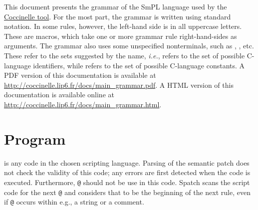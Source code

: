 


This document presents the grammar of the SmPL language used by the
\href{http://coccinelle.lip6.fr/}{Coccinelle tool}.  For the most
part, the grammar is written using standard notation.  In some rules,
however, the left-hand side is in all uppercase letters.  These are
macros, which take one or more grammar rule right-hand-sides as
arguments.  The grammar also uses some unspecified nonterminals, such
as , , etc.  These refer to the sets suggested by
the name, {\em i.e.},  refers to the set of possible
C-language identifiers, while  refers to the set of
possible C-language constants.
%
\ifhevea
A PDF version of this documentation is available at
\url{http://coccinelle.lip6.fr/docs/main_grammar.pdf}.
\else
A HTML version of this documentation is available online at
\url{http://coccinelle.lip6.fr/docs/main_grammar.html}.
\fi

\section{Program}

\begin{grammar}


\end{grammar}

\noindent
{} is any code in the chosen scripting language.  Parsing of
the semantic patch does not check the validity of this code; any errors are
first detected when the code is executed.  Furthermore, \texttt{@} should
not be use in this code.  Spatch scans the script code for the next
\texttt{@} and considers that to be the beginning of the next rule, even if
\texttt{@} occurs within e.g., a string or a comment.

